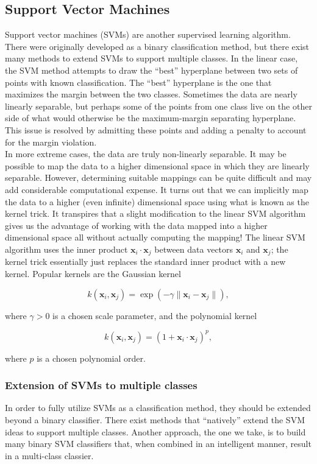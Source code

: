 \documentclass[12pt]{article}
\begin{document}
\subsection{Support Vector Machines}
Support vector machines (SVMs) are another supervised learning algorithm.  There were originally developed as a binary classification method, but there exist many methods to extend SVMs to support multiple classes.  In the linear case, the SVM method attempts to draw the ``best'' hyperplane between two sets of points with known classification.  The ``best'' hyperplane is the one that maximizes the margin between the two classes.  Sometimes the data are nearly linearly separable, but perhaps some of the points from one class live on the other side of what would otherwise be the maximum-margin separating hyperplane.  This issue is resolved by admitting these points and adding a penalty to account for the margin violation.\\

In more extreme cases, the data are truly non-linearly separable.  It may be possible to map the data to a higher dimensional space in which they are linearly separable.  However, determining suitable mappings can be quite difficult and may add considerable computational expense.  It turns out that we can implicitly map the data to a higher (even infinite) dimensional space using what is known as the kernel trick.  It transpires that a slight modification to the linear SVM algorithm gives us the advantage of working with the data mapped into a higher dimensional space all without actually computing the mapping!  The linear SVM algorithm uses the inner product $\mathbf{x}_i\cdot\mathbf{x}_j$ between data vectors $\mathbf{x}_i$ and $\mathbf{x}_j$; the kernel trick essentially just replaces the standard inner product with a new kernel.  Popular kernels are the Gaussian kernel

\[ k(\mathbf{x}_i,\mathbf{x}_j) = \exp\left(-\gamma \|\mathbf{x}_i-\mathbf{x}_j\|\right), \] 

\noindent where $\gamma>0$ is a chosen scale parameter, and the polynomial kernel

\[ k(\mathbf{x}_i,\mathbf{x}_j) = \left(1+\mathbf{x}_i\cdot\mathbf{x}_j\right)^p, \] 

\noindent where $p$ is a chosen polynomial order.\\

\subsubsection{Extension of SVMs to multiple classes}
In order to fully utilize SVMs as a classification method, they should be extended beyond a binary classifier.  There exist methods that ``natively'' extend the SVM ideas to support multiple classes.  Another approach, the one we take, is to build many binary SVM classifiers that, when combined in an intelligent manner, result in a multi-class classier.\\ 
\end{document}

